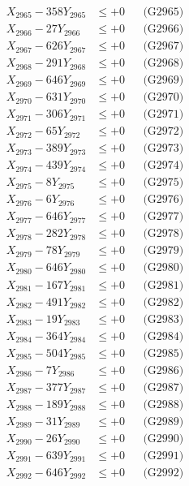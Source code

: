 \documentclass[a4paper,10pt]{article}
\begin{document}
{\begin{align}
X_{2965} - 358Y_{2965} &\leq +0 && \text{(G2965)} \\
X_{2966} - 27Y_{2966} &\leq +0 && \text{(G2966)} \\
X_{2967} - 626Y_{2967} &\leq +0 && \text{(G2967)} \\
X_{2968} - 291Y_{2968} &\leq +0 && \text{(G2968)} \\
X_{2969} - 646Y_{2969} &\leq +0 && \text{(G2969)} \\
X_{2970} - 631Y_{2970} &\leq +0 && \text{(G2970)} \\
\allowbreak
X_{2971} - 306Y_{2971} &\leq +0 && \text{(G2971)} \\
X_{2972} - 65Y_{2972} &\leq +0 && \text{(G2972)} \\
X_{2973} - 389Y_{2973} &\leq +0 && \text{(G2973)} \\
X_{2974} - 439Y_{2974} &\leq +0 && \text{(G2974)} \\
X_{2975} - 8Y_{2975} &\leq +0 && \text{(G2975)} \\
X_{2976} - 6Y_{2976} &\leq +0 && \text{(G2976)} \\
X_{2977} - 646Y_{2977} &\leq +0 && \text{(G2977)} \\
X_{2978} - 282Y_{2978} &\leq +0 && \text{(G2978)} \\
X_{2979} - 78Y_{2979} &\leq +0 && \text{(G2979)} \\
X_{2980} - 646Y_{2980} &\leq +0 && \text{(G2980)} \\
\allowbreak
X_{2981} - 167Y_{2981} &\leq +0 && \text{(G2981)} \\
X_{2982} - 491Y_{2982} &\leq +0 && \text{(G2982)} \\
X_{2983} - 19Y_{2983} &\leq +0 && \text{(G2983)} \\
X_{2984} - 364Y_{2984} &\leq +0 && \text{(G2984)} \\
X_{2985} - 504Y_{2985} &\leq +0 && \text{(G2985)} \\
X_{2986} - 7Y_{2986} &\leq +0 && \text{(G2986)} \\
X_{2987} - 377Y_{2987} &\leq +0 && \text{(G2987)} \\
X_{2988} - 189Y_{2988} &\leq +0 && \text{(G2988)} \\
X_{2989} - 31Y_{2989} &\leq +0 && \text{(G2989)} \\
X_{2990} - 26Y_{2990} &\leq +0 && \text{(G2990)} \\
\allowbreak
X_{2991} - 639Y_{2991} &\leq +0 && \text{(G2991)} \\
X_{2992} - 646Y_{2992} &\leq +0 && \text{(G2992)} \\

\end{align}}
\end{document}
